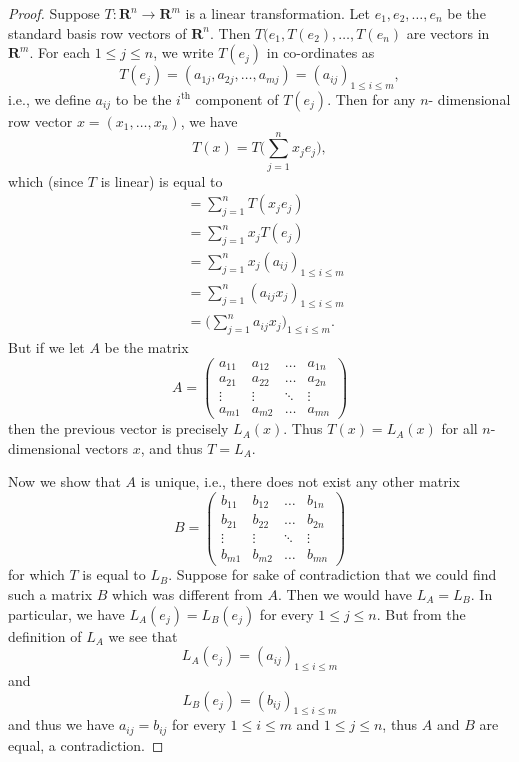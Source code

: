 \begin{proof}
    Suppose \(T : \mathbf{R}^n \to \mathbf{R}^m\) is a linear transformation.
    Let \(e_1, e_2, \dots, e_n\) be the standard basis row vectors of \(\mathbf{R}^n\).
    Then \(T(e_1, T(e_2), \dots, T(e_n)\) are vectors in \(\mathbf{R}^m\).
    For each \(1 \leq j \leq n\), we write \(T(e_j)\) in co-ordinates as
    \[
        T(e_j) = (a_{1j}, a_{2j}, \dots, a_{mj}) = (a_{ij})_{1 \leq i \leq m},
    \]
    i.e., we define \(a_{ij}\) to be the \(i^{\text{th}}\) component of \(T(e_j)\).
    Then for any \(n\)- dimensional row vector \(x = (x_1, \dots, x_n)\), we have
    \[
        T(x) = T\bigg(\sum_{j = 1}^n x_j e_j\bigg),
    \]
    which (since \(T\) is linear) is equal to
    \begin{align*}
         & = \sum_{j = 1}^n T(x_j e_j)                                \\
         & = \sum_{j = 1}^n x_j T(e_j)                                \\
         & = \sum_{j = 1}^n x_j (a_{ij})_{1 \leq i \leq m}            \\
         & = \sum_{j = 1}^n (a_{ij} x_j)_{1 \leq i \leq m}            \\
         & = \bigg(\sum_{j = 1}^n a_{ij} x_j\bigg)_{1 \leq i \leq m}.
    \end{align*}
    But if we let \(A\) be the matrix
    \[
        A = \begin{pmatrix}
            a_{11} & a_{12} & \dots  & a_{1n} \\
            a_{21} & a_{22} & \dots  & a_{2n} \\
            \vdots & \vdots & \ddots & \vdots \\
            a_{m1} & a_{m2} & \dots  & a_{mn}
        \end{pmatrix}
    \]
    then the previous vector is precisely \(L_A(x)\).
    Thus \(T(x) = L_A(x)\) for all \(n\)-dimensional vectors \(x\), and thus \(T = L_A\).

    Now we show that \(A\) is unique, i.e., there does not exist any other matrix
    \[
        B = \begin{pmatrix}
            b_{11} & b_{12} & \dots  & b_{1n} \\
            b_{21} & b_{22} & \dots  & b_{2n} \\
            \vdots & \vdots & \ddots & \vdots \\
            b_{m1} & b_{m2} & \dots  & b_{mn}
        \end{pmatrix}
    \]
    for which \(T\) is equal to \(L_B\).
    Suppose for sake of contradiction that we could find such a matrix \(B\) which was different from \(A\).
    Then we would have \(L_A = L_B\).
    In particular, we have \(L_A(e_j) = L_B(e_j)\) for every \(1 \leq j \leq n\).
    But from the definition of \(L_A\) we see that
    \[
        L_A(e_j) = (a_{ij})_{1 \leq i \leq m}
    \]
    and
    \[
        L_B(e_j) = (b_{ij})_{1 \leq i \leq m}
    \]
    and thus we have \(a_{ij} = b_{ij}\) for every \(1 \leq i \leq m\) and \(1 \leq j \leq n\), thus \(A\) and \(B\) are equal, a contradiction.
\end{proof}

